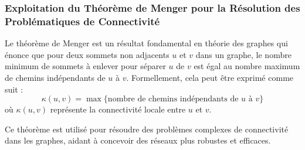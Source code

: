 \begin{frame}
\frametitle{Exploitation du Théorème de Menger pour la Résolution des Problématiques de Connectivité}
    \begin{tcolorbox}[colback=orange!10,colframe=orange!100!black,
        title=Application du Théorème de Menger]
        Le théorème de Menger est un résultat fondamental en théorie des graphes qui énonce que pour deux sommets non adjacents \( u \) et \( v \) dans un graphe, le nombre minimum de sommets à enlever pour séparer \( u \) de \( v \) est égal au nombre maximum de chemins indépendants de \( u \) à \( v \). Formellement, cela peut être exprimé comme suit :
        $$ \kappa(u,v) = \max \{ \text{nombre de chemins indépendants de } u \text{ à } v \} $$
        où \( \kappa(u,v) \) représente la connectivité locale entre \( u \) et \( v \).
        
        Ce théorème est utilisé pour résoudre des problèmes complexes de connectivité dans les graphes, aidant à concevoir des réseaux plus robustes et efficaces.
    \end{tcolorbox}
\end{frame}
